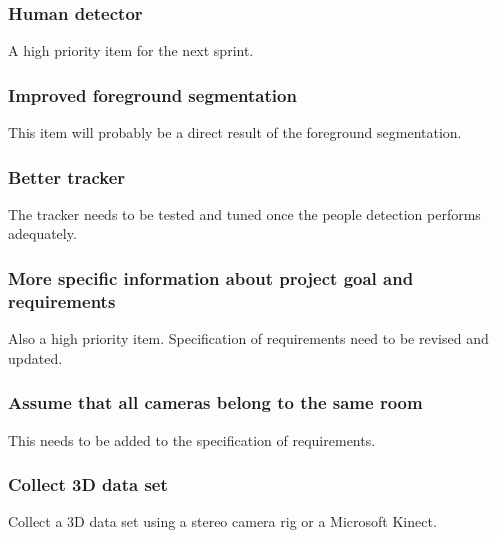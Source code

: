 \subsubsection{Human detector}
A high priority item for the next sprint.

\subsubsection{Improved foreground segmentation}
This item will probably be a direct result of the foreground segmentation.

\subsubsection{Better tracker}
The tracker needs to be tested and tuned once the people detection performs adequately.

\subsubsection{More specific information about project goal and requirements}
Also a high priority item. Specification of requirements need to be revised and updated.

\subsubsection{Assume that all cameras belong to the same room}
This needs to be added to the specification of requirements.

\subsubsection{Collect 3D data set}
Collect a 3D data set using a stereo camera rig or a Microsoft Kinect.
